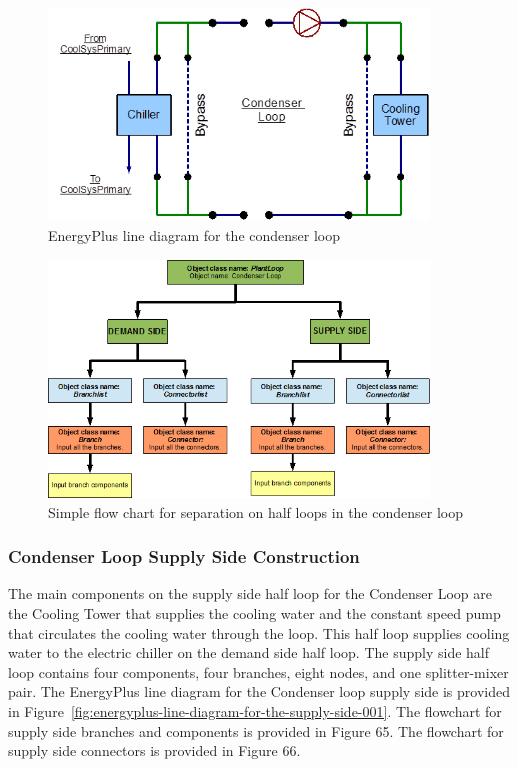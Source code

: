 \begin{figure}[hbtp] %
\centering
\includegraphics[width=0.9\textwidth, height=0.9\textheight, keepaspectratio=true]{media/image062.png}
\caption{EnergyPlus line diagram for the condenser loop \protect \label{fig:energyplus-line-diagram-for-the-condenser}}
\end{figure}

\begin{figure}[hbtp] %
\centering
\includegraphics[width=0.9\textwidth, height=0.9\textheight, keepaspectratio=true]{media/image063.png}
\caption{Simple flow chart for separation on half loops in the condenser loop \protect \label{fig:simple-flow-chart-for-separation-on-half}}
\end{figure}

\subsubsection{Condenser Loop Supply Side Construction}\label{condenser-loop-supply-side-construction}

The main components on the supply side half loop for the Condenser Loop are the Cooling Tower that supplies the cooling water and the constant speed pump that circulates the cooling water through the loop. This half loop supplies cooling water to the electric chiller on the demand side half loop. The supply side half loop contains four components, four branches, eight nodes, and one splitter-mixer pair. The EnergyPlus line diagram for the Condenser loop supply side is provided in Figure~\ref{fig:energyplus-line-diagram-for-the-supply-side-001}. The flowchart for supply side branches and components is provided in Figure 65. The flowchart for supply side connectors is provided in Figure 66.

